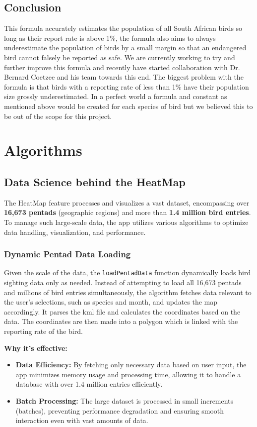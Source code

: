 \documentclass[a4paper]{article}
\begin{document}
\subsection{Conclusion}
This formula accurately estimates the population of all South African birds so long as their report rate is above 1\%, the formula also aims to always underestimate the population of birds by a small margin so that an endangered bird cannot falsely be reported as safe. We are currently working to try and further improve this formula and recently have started collaboration with Dr. Bernard Coetzee and his team towards this end. The biggest problem with the formula is that birds with a reporting rate of less than 1\% have their population size grossly underestimated. In a perfect world a formula and constant as mentioned above would be created for each species of bird but we believed this to be out of the scope for this project.

\section{Algorithms}
\subsection{Data Science behind the HeatMap}

The HeatMap feature processes and visualizes a vast dataset, encompassing over \textbf{16,673 pentads} (geographic regions) and more than \textbf{1.4 million bird entries}. To manage such large-scale data, the app utilizes various algorithms to optimize data handling, visualization, and performance.

\subsubsection{Dynamic Pentad Data Loading}
Given the scale of the data, the \texttt{loadPentadData} function dynamically loads bird sighting data only as needed. Instead of attempting to load all 16,673 pentads and millions of bird entries simultaneously, the algorithm fetches data relevant to the user's selections, such as species and month, and updates the map accordingly. It parses the kml file and calculates the coordinates based on the data. The coordinates are then made into a polygon which is linked with the reporting rate of the bird. 

\textbf{Why it's effective:}
\begin{itemize}
    \item \textbf{Data Efficiency:} By fetching only necessary data based on user input, the app minimizes memory usage and processing time, allowing it to handle a database with over 1.4 million entries efficiently.
    \item \textbf{Batch Processing:} The large dataset is processed in small increments (batches), preventing performance degradation and ensuring smooth interaction even with vast amounts of data.
\end{itemize}
\end{document}
